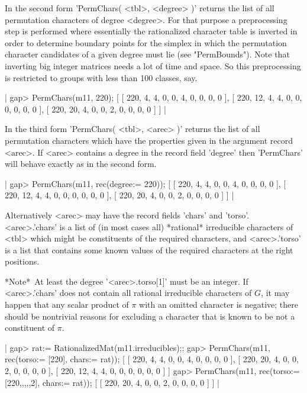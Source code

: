 In the second form 'PermChars( <tbl>, <degree> )' returns the list of all
permutation  characters  of  degree  <degree>.    For   that  purpose   a
preprocessing  step  is  performed  where  essentially  the  rationalized
character table is inverted in order to determine boundary points for the
simplex in which  the permutation character candidates of a given  degree
must lie (see  "PermBounds").   Note that inverting big  integer matrices
needs  a  lot of time and space.  So this preprocessing is  restricted to
groups with less than 100 classes, say.

|    gap> PermChars(m11, 220);
    [ [ 220, 4, 4, 0, 0, 4, 0, 0, 0, 0 ],
      [ 220, 12, 4, 4, 0, 0, 0, 0, 0, 0 ],
      [ 220, 20, 4, 0, 0, 2, 0, 0, 0, 0 ] ] |

In the third form 'PermChars( <tbl>, <arec>  )' returns  the list of  all
permutation  characters which have the properties given  in  the argument
record  <arec>. If <arec> contains a  degree in the record field 'degree'
then 'PermChars' will behave exactly as in the second form.

|    gap> PermChars(m11, rec(degree:= 220));
    [ [ 220, 4, 4, 0, 0, 4, 0, 0, 0, 0 ],
      [ 220, 12, 4, 4, 0, 0, 0, 0, 0, 0 ],
      [ 220, 20, 4, 0, 0, 2, 0, 0, 0, 0 ] ] |

Alternatively <arec> may  have the  record  fields 'chars'  and  'torso'.
<arec>.'chars' is  a list  of (in most cases  all) *rational* irreducible
characters   of  <tbl>  which  might  be  constituents  of  the  required
characters, and <arec>.'torso' is a list that  contains some known values
of the required characters at the right positions.

*Note*\:\ At least the degree '<arec>.torso[1]'  must be an integer.   If
<arec>.'chars' does not contain  all  rational irreducible characters  of
$G$,  it may happen  that any scalar  product of  $\pi$ with  an  omitted
character is negative; there should be nontrivial reasons for excluding a
character that is known to be not a constituent of $\pi$.

|    gap> rat:= RationalizedMat(m11.irreducibles);;
    gap> PermChars(m11, rec(torso:= [220], chars:= rat));
    [ [ 220, 4, 4, 0, 0, 4, 0, 0, 0, 0 ],
      [ 220, 20, 4, 0, 0, 2, 0, 0, 0, 0 ],
      [ 220, 12, 4, 4, 0, 0, 0, 0, 0, 0 ] ]
    gap> PermChars(m11, rec(torso:= [220,,,,,2], chars:= rat));
    [ [ 220, 20, 4, 0, 0, 2, 0, 0, 0, 0 ] ] |

%

